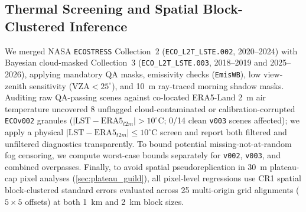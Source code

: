 \subsection{Thermal Screening and Spatial Block-Clustered Inference}
We merged NASA \texttt{ECOSTRESS} Collection~2 (\texttt{ECO\_L2T\_LSTE.002}, 2020--2024) with Bayesian cloud-masked Collection~3 (\texttt{ECO\_L2T\_LSTE.003}, 2018--2019 and 2025--2026), applying mandatory QA masks, emissivity checks (\texttt{EmisWB}), low view-zenith sensitivity ($\text{VZA}<25^\circ$), and 10~m ray-traced morning shadow masks. Auditing raw QA-passing scenes against co-located ERA5-Land 2~m air temperature uncovered 8 unflagged cloud-contaminated or calibration-corrupted \texttt{ECOv002} granules ($|\text{LST}-\text{ERA5}_{t2m}| > 10^\circ$C; 0/14 clean \texttt{v003} scenes affected); we apply a physical $|\text{LST}-\text{ERA5}_{t2m}| \le 10^\circ$C screen and report both filtered and unfiltered diagnostics transparently. To bound potential missing-not-at-random fog censoring, we compute \citet{manski1990} worst-case bounds separately for \texttt{v002}, \texttt{v003}, and combined overpasses. Finally, to avoid spatial pseudoreplication in 30~m plateau-cap pixel analyses (\cref{sec:plateau_guild}), all pixel-level regressions use CR1 spatial block-clustered standard errors evaluated across 25 multi-origin grid alignments ($5 \times 5$ offsets) at both 1~km and 2~km block sizes.
